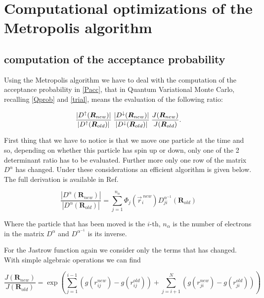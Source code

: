 \section{Computational optimizations of the Metropolis algorithm}
\label{impalgo}

\subsection{computation of the acceptance probability}
\label{PaccComp}

Using the Metropolis algorithm we have to deal with the computation of the acceptance probability in \autoref{Pacc}, that in Quantum Variational Monte Carlo, recalling \autoref{Qprob} and \autoref{trial}, means the evaluation of the following ratio:

\begin{equation}
\dfrac{|D^\uparrow(\bm{R}_{new})|}{|D^\uparrow(\bm{R}_{old})|} \> \dfrac{|D^\downarrow(\bm{R}_{new})|}{|D^\downarrow(\bm{R}_{old})|} \> \dfrac{J(\bm{R}_{new})}{J(\bm{R}_{old})}.
\end{equation}

First thing that we have to notice is that we move one particle at the time and so, depending on whether this particle has spin up or down, only one of the 2 determinant ratio has to be evaluated.
Further more only one row of the matrix $D^\alpha$ has changed.
Under these considerations an efficient algorithm is given below.
The full derivation is available in Ref\cite{notesOslo,larsevind}.

\begin{equation}
  \dfrac{|D^\alpha(\bm{R}_{new})|}{|D^\alpha(\bm{R}_{old})|}=\sum_{j=1}^{n_{\alpha}}\Phi_{j}(\vec{r}_i^{\>new})D^{\alpha^{-1}}_{ji}(\bm{R}_{old})
  \label{detratio}
\end{equation}

Where the particle that has been moved is the $i$-th, $n_\alpha$ is the number of electrons in the matrix $D^{\alpha}$ and $D^{\alpha^{-1}}$ is its inverse.

For the Jastrow function again we consider only the terms that has changed. With simple algebraic operations we can find

\begin{equation}
  \dfrac{J(\bm{R}_{new})}{J(\bm{R}_{old})}=\exp\left(\sum_{j=1}^{i-1}\left(g(r_{ij}^{new})-g(r_{ij}^{old})\right)
  + \sum_{j=i+1}^N\left(g(r_{ji}^{new})-g(r_{ji}^{old})\right)\right)
\end{equation}

